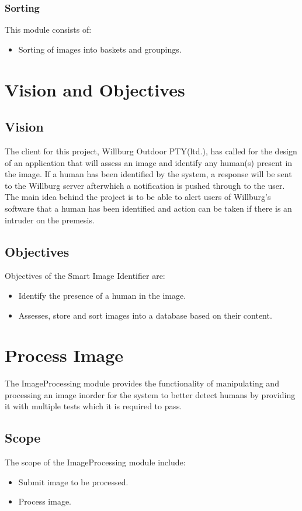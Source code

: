 \documentclass[a4paper,12pt]{report}
\begin{document}
	\subsubsection {Sorting}
		This module consists of:
			\begin {itemize}
				\item Sorting of images into baskets and groupings.
			\end {itemize}


\section {Vision and Objectives}
	\subsection {Vision}
	 The client for this project, Willburg Outdoor PTY(ltd.), has called for the design of an application that will assess an image and identify any human(s) present in the image. If a human has been identified by the system, a response will be sent to the Willburg server afterwhich a notification is pushed through to the user. The main idea behind the project is to be able to alert users of Willburg's software that a human has been identified and action can be taken if there is an intruder on the premesis.

	\subsection {Objectives}
	Objectives of the Smart Image Identifier are:
	\begin {itemize}
		\item Identify the presence of a human in the image.
		\item Assesses, store and sort images into a database based on their content.
	\end {itemize}


\section {Process Image}
The ImageProcessing module provides the functionality of manipulating and processing an image inorder for the system to better detect  humans by providing it with multiple tests which it is required to pass.
	\FloatBarrier
	\subsection {Scope}
		The scope of the ImageProcessing module include:
			\begin {itemize}
				\item Submit image to be processed.
				\item Process image.
			\end {itemize}
\end{document}
